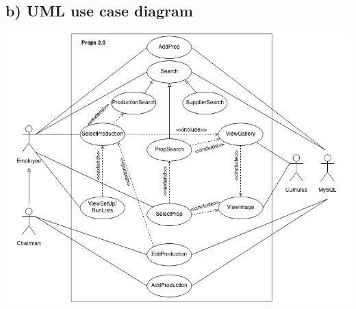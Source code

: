 \documentclass[12pt]{article}
\begin{document}
\subsection{b) UML use case diagram}
\includegraphics[scale=0.6]{use.png}
\end{document}
